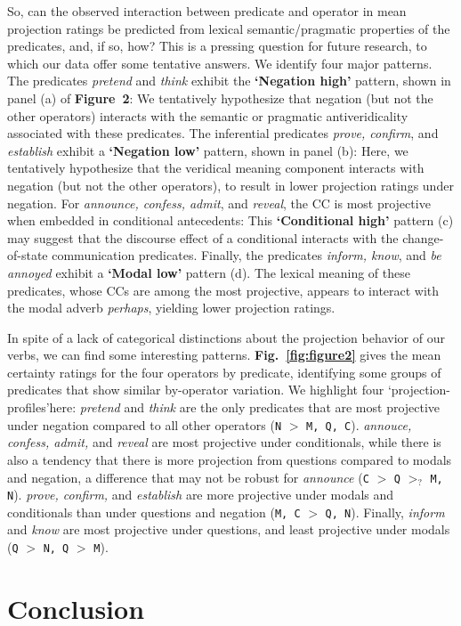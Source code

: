 \documentclass[a4paper,12pt,twoside]{article}
\begin{document}
	So, can the observed interaction between predicate and operator in mean projection ratings be predicted from lexical semantic/pragmatic properties of the predicates, and, if so, how?
	This is a pressing question for future research, to which our data offer some tentative answers. We identify four major patterns.
	The predicates \emph{pretend} and \emph{think} exhibit the {\bf `Negation high'} pattern, shown in panel (a) of \textbf{Figure~2}: We tentatively hypothesize that negation (but not the other operators) interacts with the semantic or pragmatic antiveridicality associated with these predicates.
	The inferential predicates \emph{prove, confirm}, and \emph{establish} exhibit a {\bf `Negation low'} pattern, shown in panel (b): Here, we tentatively hypothesize that the veridical meaning component interacts with negation (but not the other operators), to result in lower projection ratings under negation.
	For \emph{announce, confess, admit}, and \emph{reveal}, the CC is most projective when embedded in conditional antecedents: This {\bf `Conditional high'} pattern (c) may suggest that the discourse effect of a conditional interacts with the change-of-state communication predicates.
	Finally, the predicates  \emph{inform, know}, and \emph{be annoyed} exhibit a {\bf `Modal low'} pattern (d). The lexical meaning of these predicates, whose CCs are among the most projective, appears to interact with the modal adverb {\em perhaps}, yielding lower projection ratings.

	In spite of a lack of categorical distinctions about the projection behavior of our verbs, we can find some interesting patterns. \textbf{Fig.~\ref{fig:figure2}} gives the mean certainty ratings for the four operators by predicate, identifying some groups of predicates that show similar by-operator variation. We highlight four \lq projection-profiles\rq here: \emph{pretend} and \emph{think} are the only predicates that are most projective under negation compared to all other operators (\texttt{N} $>$ \texttt{M, Q, C}). \emph{annouce, confess, admit,} and \emph{reveal} are most projective under conditionals, while there is also a tendency that there is more projection from questions compared to modals and negation, a difference that may not be robust for \emph{announce} (\texttt{C} $>$ \texttt{Q} \textcolor{gray!40}{$>_?$} \texttt{M, N}). \emph{prove, confirm,} and \emph{establish} are more projective under modals and conditionals than under questions and negation (\texttt{M, C} $>$ \texttt{Q, N}). Finally, \emph{inform} and \emph{know} are most projective under questions, and least projective under modals (\texttt{Q} $>$ \texttt{N, Q} $>$ \texttt{M}).
	
\section{Conclusion}


\newpage


\end{document}
